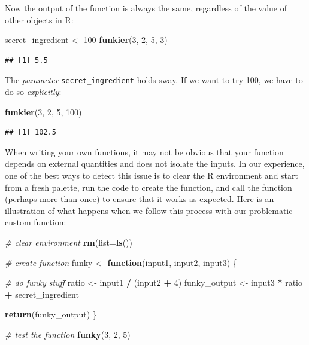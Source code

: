 \documentclass[
]{book}
\newenvironment{Shaded}{\begin{snugshade}}{\end{snugshade}}
\newcommand{\AttributeTok}[1]{\textcolor[rgb]{0.13,0.29,0.53}{#1}}
\newcommand{\CommentTok}[1]{\textcolor[rgb]{0.56,0.35,0.01}{\textit{#1}}}
\newcommand{\ControlFlowTok}[1]{\textcolor[rgb]{0.13,0.29,0.53}{\textbf{#1}}}
\newcommand{\DecValTok}[1]{\textcolor[rgb]{0.00,0.00,0.81}{#1}}
\newcommand{\FunctionTok}[1]{\textcolor[rgb]{0.13,0.29,0.53}{\textbf{#1}}}
\newcommand{\NormalTok}[1]{#1}
\newcommand{\OtherTok}[1]{\textcolor[rgb]{0.56,0.35,0.01}{#1}}
\newcommand{\SpecialCharTok}[1]{\textcolor[rgb]{0.81,0.36,0.00}{\textbf{#1}}}
\begin{document}
Now the output of the function is always the same, regardless of the value of other objects in R:

\begin{Shaded}
\begin{Highlighting}[]
\NormalTok{secret\_ingredient }\OtherTok{\textless{}{-}} \DecValTok{100}
\FunctionTok{funkier}\NormalTok{(}\DecValTok{3}\NormalTok{, }\DecValTok{2}\NormalTok{, }\DecValTok{5}\NormalTok{, }\DecValTok{3}\NormalTok{)}
\end{Highlighting}
\end{Shaded}

\begin{verbatim}
## [1] 5.5
\end{verbatim}

The \emph{parameter} \texttt{secret\_ingredient} holds sway. If we want to try 100, we have to do so \emph{explicitly}:

\begin{Shaded}
\begin{Highlighting}[]
\FunctionTok{funkier}\NormalTok{(}\DecValTok{3}\NormalTok{, }\DecValTok{2}\NormalTok{, }\DecValTok{5}\NormalTok{, }\DecValTok{100}\NormalTok{)}
\end{Highlighting}
\end{Shaded}

\begin{verbatim}
## [1] 102.5
\end{verbatim}

When writing your own functions, it may not be obvious that your function depends on external quantities and does not isolate the inputs.
In our experience, one of the best ways to detect this issue is to clear the R environment and start from a fresh palette, run the code to create the function, and call the function (perhaps more than once) to ensure that it works as expected.
Here is an illustration of what happens when we follow this process with our problematic custom function:

\begin{Shaded}
\begin{Highlighting}[]
\CommentTok{\# clear environment}
\FunctionTok{rm}\NormalTok{(}\AttributeTok{list=}\FunctionTok{ls}\NormalTok{()) }

\CommentTok{\# create function}
\NormalTok{funky }\OtherTok{\textless{}{-}} \ControlFlowTok{function}\NormalTok{(input1, input2, input3) \{}
  
  \CommentTok{\# do funky stuff}
\NormalTok{  ratio }\OtherTok{\textless{}{-}}\NormalTok{ input1 }\SpecialCharTok{/}\NormalTok{ (input2 }\SpecialCharTok{+} \DecValTok{4}\NormalTok{)}
\NormalTok{  funky\_output }\OtherTok{\textless{}{-}}\NormalTok{ input3 }\SpecialCharTok{*}\NormalTok{ ratio }\SpecialCharTok{+}\NormalTok{ secret\_ingredient}
  
  \FunctionTok{return}\NormalTok{(funky\_output)  }
\NormalTok{\}}

\CommentTok{\# test the function}
\FunctionTok{funky}\NormalTok{(}\DecValTok{3}\NormalTok{, }\DecValTok{2}\NormalTok{, }\DecValTok{5}\NormalTok{)}
\end{Highlighting}
\end{Shaded}
\end{document}
